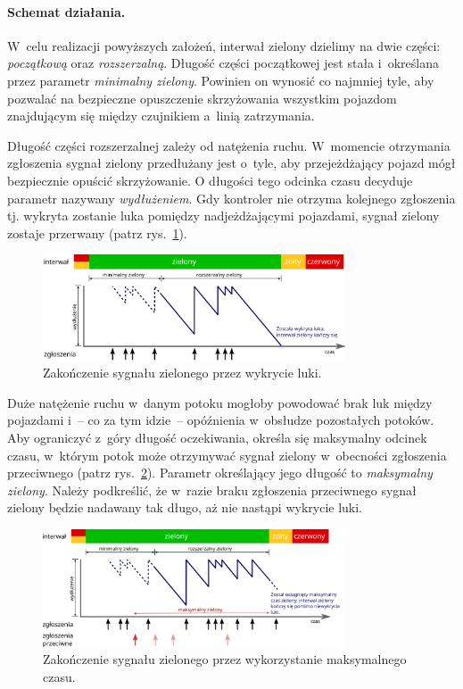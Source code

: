 \documentclass{pracamgr}
\newcommand{\imgr}[1]{rys.~\ref{#1}}
\theoremstyle{plain}
\begin{document}
\paragraph{Schemat działania.} W~celu realizacji powyższych założeń,
interwał zielony dzielimy na dwie części: \emph{początkową} oraz
\emph{rozszerzalną}. Długość części początkowej jest stała i~określana
przez parametr \emph{minimalny zielony}. Powinien on wynosić co
najmniej tyle, aby pozwalać na bezpieczne opuszczenie skrzyżowania
wszystkim pojazdom znajdującym się między czujnikiem a~linią
zatrzymania.

Długość części rozszerzalnej zależy od natężenia ruchu. W~momencie
otrzymania zgłoszenia sygnał zielony przedłużany jest o~tyle, aby
przejeżdżający pojazd mógł bezpiecznie opuścić skrzyżowanie. O
długości tego odcinka czasu decyduje parametr nazywany
\emph{wydłużeniem}. Gdy kontroler nie otrzyma kolejnego
zgłoszenia tj. wykryta zostanie luka pomiędzy nadjeżdżającymi
pojazdami, sygnał zielony zostaje przerwany (patrz
\imgr{img:gap-out}).

\begin{figure}[h] \centering
  \includegraphics[width=0.8\textwidth]{img/signals-gap-out}
  \caption{Zakończenie sygnału zielonego przez wykrycie luki.}
\label{img:gap-out}
\end{figure}

Duże natężenie ruchu w~danym potoku mogłoby powodować brak luk między
pojazdami i~-- co za tym idzie~-- opóźnienia w~obsłudze pozostałych
potoków. Aby ograniczyć z~góry długość oczekiwania, określa się
maksymalny odcinek czasu, w~którym potok może otrzymywać sygnał
zielony w~obecności zgłoszenia przeciwnego (patrz
\imgr{img:max-out}). Parametr określający jego długość to
\emph{maksymalny zielony}. Należy podkreślić, że w~razie braku
zgłoszenia przeciwnego sygnał zielony będzie nadawany tak długo, aż
nie nastąpi wykrycie luki.
\begin{figure}[h] \centering
  \includegraphics[width=0.8\textwidth]{img/signals-max-out}
  \caption{Zakończenie sygnału zielonego przez wykorzystanie
maksymalnego czasu.}
\label{img:max-out}
\end{figure}
\end{document}
